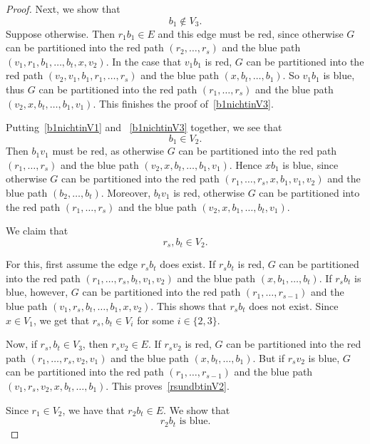 \documentclass[a4paper,10pt]{article}
\begin{document}
\begin{proof}
\medskip

Next, we show that
\begin{equation}\label{b1nichtinV3}
 \text{$b_1 \notin V_3$.}
 \end{equation}
 Suppose otherwise. 
Then $r_1b_1 \in E$ and this edge must be red, since otherwise $G$ can be partitioned into the red path $(r_2,\ldots,r_s)$ and the blue path $(v_1,r_1,b_1,\ldots,b_t,x,v_2)$.
In the case that $v_1b_1$ is red, $G$ can be partitioned into the red path $(v_2,v_1,b_1,r_1,\ldots,r_s)$ and the blue path $(x,b_t,\ldots,b_1)$.
So $v_1b_1$ is blue, thus $G$ can be partitioned into the red path $(r_1,\ldots,r_s)$ and the blue path $(v_2,x,b_t,\ldots,b_1,v_1)$.
This finishes the proof of~\eqref{b1nichtinV3}.

\medskip

Putting~\eqref{b1nichtinV1} and ~\eqref{b1nichtinV3} together, we see that $$b_1\in V_2.$$
 Then $b_1v_1$ must be red, as otherwise $G$ can be partitioned into the red path $(r_1,\ldots,r_s)$ and the blue path $(v_2,x,b_t,\ldots,b_1,v_1)$.
Hence $xb_1$ is blue, since otherwise $G$ can be partitioned into the red path $(r_1,\ldots,r_s,x,b_1,v_1,v_2)$ and the blue path $(b_2,\ldots,b_t)$.
Moreover, $b_tv_1$ is red, otherwise $G$ can be partitioned into the red path $(r_1,\ldots,r_s)$ and the blue path $(v_2,x,b_1,\ldots,b_t,v_1)$.

We claim that
\begin{equation}\label{rsundbtinV2}
 \text{$r_s,b_t \in V_2$.}
 \end{equation}

For this, first assume the edge $r_sb_t$ does exist.
If $r_sb_t$ is red, $G$ can be partitioned into the red path $(r_1,\ldots,r_s,b_t,v_1,v_2)$ and the blue path $(x,b_1,\ldots,b_t)$.
If $r_sb_t$ is blue, however, $G$ can be partitioned into the red path $(r_1,\ldots,r_{s-1})$ and the blue path $(v_1,r_s,b_t,\ldots,b_1,x,v_2)$. This shows that $r_sb_t$ does not exist.
Since $x \in V_1$, we get that $r_s,b_t \in V_i$ for some $i \in \{2,3\}$.

Now, if $r_s,b_t \in V_3$, then $r_sv_2 \in E$.
If $r_sv_2$ is red, $G$ can be partitioned into the red path $(r_1,\ldots,r_s,v_2,v_1)$ and the blue path $(x,b_t,\ldots,b_1)$.
But if $r_sv_2$ is blue, $G$ can be partitioned into the red path $(r_1,\ldots,r_{s-1})$ and the blue path $(v_1,r_s,v_2,x,b_t,\ldots,b_1)$.
This proves~\eqref{rsundbtinV2}.

Since $r_1 \in V_2$, we have that $r_2b_t \in E$. We show that
\begin{equation}\label{r2btblau}
 \text{$r_2b_t$ is blue.}
 \end{equation}


\end{proof}
\end{document}
